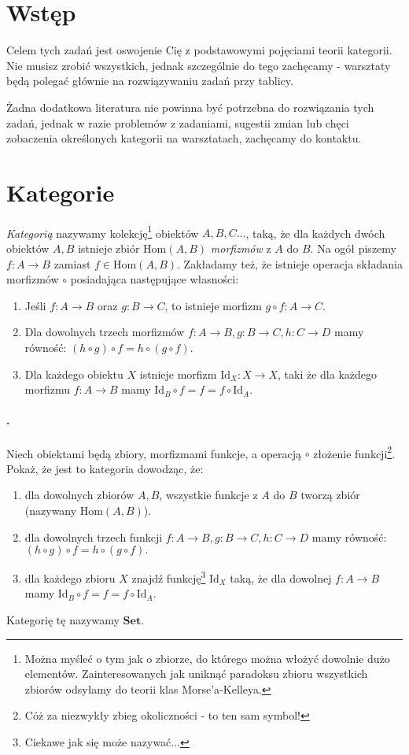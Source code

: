 \documentclass{article}
\newcounter{itemnum}
\newenvironment{prob}
{\stepcounter{itemnum}
\paragraph*{\arabic{itemnum}.}}
{}
\newcommand{\Hom}{\text{Hom}}
\newcommand{\Id}{\text{Id}}
\newcommand{\Set}{\textbf{Set}}
\begin{document}
\section{Wstęp}
  Celem tych zadań jest oswojenie Cię z podstawowymi pojęciami teorii kategorii. Nie musisz zrobić wszystkich, jednak szczególnie do tego zachęcamy - warsztaty będą polegać głównie na rozwiązywaniu zadań przy tablicy.

  Żadna dodatkowa literatura nie powinna być potrzebna do rozwiązania tych zadań, jednak w razie problemów z zadaniami, sugestii zmian lub chęci zobaczenia określonych kategorii na warsztatach, zachęcamy do kontaktu.

\section{Kategorie}
\emph{Kategorią} nazywamy kolekcję\footnote{Można myśleć o tym jak o zbiorze, do którego można włożyć dowolnie dużo elementów. Zainteresowanych jak uniknąć paradoksu zbioru wszystkich zbiorów odsyłamy do teorii klas Morse'a-Kelleya.} obiektów $A, B, C\dots$, taką, że dla każdych dwóch obiektów $A, B$ istnieje zbiór $\Hom(A, B)$ \textit{morfizmów} z $A$ do $B$. Na ogół piszemy $f:A\to B$ zamiast $f\in \Hom(A,B)$. Zakładamy też, że istnieje operacja składania morfizmów $\circ$ posiadająca następujące własności:
\begin{enumerate}
  \item Jeśli $f:A\to B$ oraz $g: B\to C$, to istnieje morfizm $g\circ f: A\to C$.
  \item Dla dowolnych trzech morfizmów $f:A\to B, g:B\to C, h:C\to D$ mamy równość: $(h\circ g)\circ f = h\circ(g\circ f).$
  \item Dla każdego obiektu $X$ istnieje morfizm $\Id_X: X\to X$, taki że dla każdego morfizmu $f:A\to B$ mamy $\Id_B\circ f=f=f\circ\Id_A$.
\end{enumerate}

\begin{prob}
  Niech obiektami będą zbiory, morfizmami funkcje, a operacją $\circ$ złożenie funkcji\footnote{Cóż za niezwykły zbieg okoliczności - to ten sam symbol!}. Pokaż, że
  jest to kategoria dowodząc, że:
  \begin{enumerate}
    \item dla dowolnych zbiorów $A, B$, wszystkie funkcje z $A$ do $B$ tworzą zbiór (nazywany $\Hom(A,B)$).
    \item dla dowolnych trzech funkcji $f:A\to B, g:B\to C, h:C\to D$ mamy równość: $(h\circ g)\circ f = h\circ(g\circ f).$
    \item dla każdego zbioru $X$ znajdź funkcję\footnote{Ciekawe jak się może nazywać...} $\Id_X$ taką, że dla dowolnej $f:A\to B$ mamy $\Id_B\circ f=f=f\circ\Id_A$.
  \end{enumerate}
  Kategorię tę nazywamy $\Set$.
\end{prob}
\end{document}
